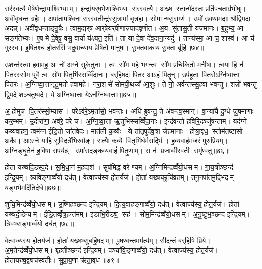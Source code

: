 सर॑स्वत्यै मे॒षेणेन्द्रा॑या॒श्विभ्याम्। इन्द्रा॑यर्‌ष॒भेणा॒श्विभ्या॒ सर॑स्वत्यै। अख्ष॒ स्तान्मे॑द॒स्तः प्रति॑पच॒ताग्र॑भीषुः। अवी॑वृधन्त॒ ग्रहैः। अपा॑ताम॒श्विना॒ सर॑स्व॒तीन्द्र॑स्सु॒त्रामा॑ वृत्र॒हा। सोमान्थ्सु॒राम्ण॑। उपो॑ उक्थाम॒दाः श्रौ॒द्विमदा॑ अदन्न्। अवी॑वृधन्ताङ्गू॒षैः। त्वाम॒द्यर्‌ष॑ आर्‌षेयर्‌षीणान्नपादवृणीत। अ॒य सु॑तासु॒ती यज॑मानः। ब॒हुभ्य॒ आ सङ्ग॑तेभ्यः। ए॒ष मे॑ दे॒वेषु॒ वसु॒ वार्या य॑क्ष्यत॒ इति॑। ता या दे॒वा दे॑व॒दाना॒न्यदु॑। तान्य॑स्मा॒ आ च॒ शास्व॑। आ च॑ गुरस्व। इ॒षि॒तश्च॑ होत॒रसि॑ भद्र॒वाच्या॑य॒ प्रेषि॑तो॒ मानु॑षः। सू॒क्त॒वा॒काय॑ सू॒क्ता ब्रू॑हि॥७४॥\anuvakamend[इन्द्रा॑य॒ यज॑मानस्स॒प्त च॑]

उ॒शन्त॑स्त्वा हवामह॒ आ नो॑ अग्ने सुके॒तुना। त्व सो॑म म॒हे भग॒न्त्व सो॑म॒ प्रचि॑कितो मनी॒षा। त्वया॒ हि न॑ पि॒तर॑स्सोम॒ पूर्वे॒ त्व सो॑म पि॒तृभि॑स्सव्विँदा॒नः। बर्‌हि॑षदः पितर॒ आऽहं पि॒तॄन्। उप॑हूताः पि॒तरोऽग्नि॑ष्वात्ताः पितरः। अ॒ग्निष्वा॒त्तानृ॑तु॒मतो॑ हवामहे। नरा॒शसे॑ सोमपी॒थय्यँ आ॒शुः। ते नो॒ अर्व॑न्तस्सु॒हवा॑ भवन्तु। शन्नो॑ भवन्तु द्वि॒पदे॒ शञ्चतु॑ष्पदे। ये अ॑ग्निष्वा॒त्ता येऽन॑ग्निष्वात्ताः॥७५॥

अ॒हो॒मुच॑ पि॒तर॑स्सो॒म्यास॑। परेऽव॑रे॒ऽमृता॑सो॒ भव॑न्तः। अधि॑ ब्रुवन्तु॒ ते अ॑वन्त्व॒स्मान्। वा॒न्या॑यै दु॒ग्धे जु॒षमा॑णाः कर॒म्भम्। उ॒दीरा॑णा॒ अव॑रे॒ परे॑ च। अ॒ग्नि॒ष्वा॒त्ता ऋ॒तुभि॑स्सव्विँदा॒नाः। इन्द्र॑वन्तो ह॒विरि॒दञ्जु॑षन्ताम्। यद॑ग्ने कव्यवाहन॒ त्वम॑ग्न ईडि॒तो जा॑तवेदः। मात॑ली क॒व्यैः। ये ता॑तृ॒पुर्दे॑व॒त्रा जेह॑मानाः। हो॒त्रा॒वृध॒ स्तोम॑तष्टासो अ॒र्कैः। आऽग्ने॑ याहि सुवि॒दत्रे॑भिर॒र्वाङ्। स॒त्यैः क॒व्यैः पि॒तृभि॑र्घर्म॒सद्भि॑। ह॒व्य॒वाह॑म॒जरं॑ पुरुप्रि॒यम्। अ॒ग्निङ्घृ॒तेन॑ ह॒विषा॑ सप॒र्यन्न्। उपा॑सदङ्कव्य॒वाहं॑ पितृ॒णाम्। स न॑ प्र॒जाव्वीँ॒रव॑ती॒ समृ॑ण्वतु॥७६॥\anuvakamend[अन॑ग्निष्वात्ता॒ जेह॑मानास्स॒प्त च॑]

होता॑ यख्षदि॒डस्प॒दे। स॒मि॒धा॒नं म॒हद्यश॑। सुष॑मिद्धं॒ वरेण्यम्। अ॒ग्निमिन्द्र॑व्वँयो॒धसम्। गा॒य॒त्रीञ्छन्द॑ इन्द्रि॒यम्। त्र्यवि॒ङ्गाव्वँयो॒ दध॑त्। वेत्वाज्य॑स्य॒ होत॒र्यज॑। होता॑ यख्ष॒च्छुचि॑व्रतम्। तनू॒नपा॑तमु॒द्भिदम्। यङ्गर्भ॒मदि॑तिर्द॒धे॥७७॥

शुचि॒मिन्द्र॑व्वँयो॒धसम्। उ॒ष्णिह॒ञ्छन्द॑ इन्द्रि॒यम्। दि॒त्य॒वाह॒ङ्गाव्वँयो॒ दध॑त्। वेत्वाज्य॑स्य॒ होत॒र्यज॑। होता॑ यख्षदी॒डेन्यम्। ई॒डि॒तव्वृँ॑त्र॒हन्त॑मम्। इडा॑भि॒रीड्य॒ सह॑। सोम॒मिन्द्र॑व्वँयो॒धसम्। अ॒नु॒ष्टुभ॒ञ्छन्द॑ इन्द्रि॒यम्। त्रि॒व॒थ्सङ्गाव्वँयो॒ दध॑त्॥७८॥

वेत्वाज्य॑स्य॒ होत॒र्यज॑। होता॑ यख्षथ्सुबर्\mbox{}हि॒षदम्। पू॒ष॒ण्वन्त॒मम॑र्त्यम्। सीद॑न्तं ब॒र्॒हिषि॑ प्रि॒ये। अ॒मृतेन्द्र॑व्वँयो॒धसम्। बृ॒ह॒तीञ्छन्द॑ इन्द्रि॒यम्। पञ्चा॑वि॒ङ्गाव्वँयो॒ दध॑त्। वेत्वाज्य॑स्य॒ होत॒र्यज॑। होता॑यख्ष॒द्व्यच॑स्वतीः। सु॒प्रा॒य॒णा ऋ॑ता॒वृध॑॥७९॥

